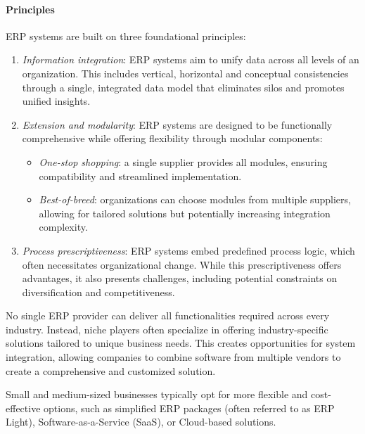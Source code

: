\paragraph*{Principles}
ERP systems are built on three foundational principles:
\begin{enumerate}
    \item \textit{Information integration}: ERP systems aim to unify data across all levels of an organization. 
        This includes vertical, horizontal and conceptual consistencies through a single, integrated data model that eliminates silos and promotes unified insights.
    \item \textit{Extension and modularity}: ERP systems are designed to be functionally comprehensive while offering flexibility through modular components:
        \begin{itemize}
            \item \textit{One-stop shopping}: a single supplier provides all modules, ensuring compatibility and streamlined implementation.
            \item \textit{Best-of-breed}: organizations can choose modules from multiple suppliers, allowing for tailored solutions but potentially increasing integration complexity.
        \end{itemize}
    \item \textit{Process prescriptiveness}: ERP systems embed predefined process logic, which often necessitates organizational change. 
        While this prescriptiveness offers advantages, it also presents challenges, including potential constraints on diversification and competitiveness.
\end{enumerate}
\noindent No single ERP provider can deliver all functionalities required across every industry. 
Instead, niche players often specialize in offering industry-specific solutions tailored to unique business needs. 
This creates opportunities for system integration, allowing companies to combine software from multiple vendors to create a comprehensive and customized solution.

Small and medium-sized businesses typically opt for more flexible and cost-effective options, such as simplified ERP packages (often referred to as ERP Light), Software-as-a-Service (SaaS), or Cloud-based solutions. 